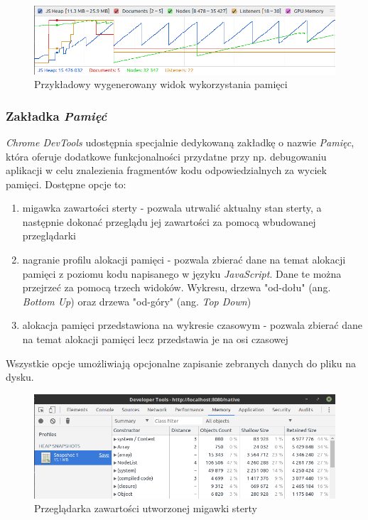 \documentclass[polish, twoside, 12pt]{mwart}
\begin{document}
\begin{figure}[ht]
  \includegraphics[width=\textwidth]{chrome-devtools-performance-memory-view.png}
	\caption{Przykładowy wygenerowany widok wykorzystania pamięci}
\end{figure}

\subsubsection{Zakładka \emph{Pamięć}}

\emph{Chrome DevTools} udostępnia specjalnie dedykowaną zakładkę o nazwie \emph{Pamięc}, która oferuje dodatkowe funkcjonalności przydatne przy np. debugowaniu aplikacji w celu znalezienia fragmentów kodu odpowiedzialnych za wyciek pamięci. Dostępne opcje to:

\begin{enumerate}
  \item migawka zawartości sterty - pozwala utrwalić aktualny stan sterty, a następnie dokonać przeglądu jej zawartości za pomocą wbudowanej przeglądarki
  \item nagranie profilu alokacji pamięci - pozwala zbierać dane na temat alokacji pamięci z poziomu kodu napisanego w języku \emph{JavaScript}. Dane te można przejrzeć za pomocą trzech widoków. Wykresu, drzewa "od-dołu" (ang. \emph{Bottom Up}) oraz drzewa "od-góry" (ang. \emph{Top Down})
  \item alokacja pamięci przedstawiona na wykresie czasowym - pozwala zbierać dane na temat alokacji pamięci lecz przedstawia je na osi czasowej
\end{enumerate}

Wszystkie opcje umożliwiają opcjonalne zapisanie zebranych danych do pliku na dysku.

\begin{figure}[ht]
  \includegraphics[width=\textwidth]{chrome-devtools-performance-heap-snapshot.png}
	\caption{Przeglądarka zawartości utworzonej migawki sterty}
\end{figure}
\end{document}
